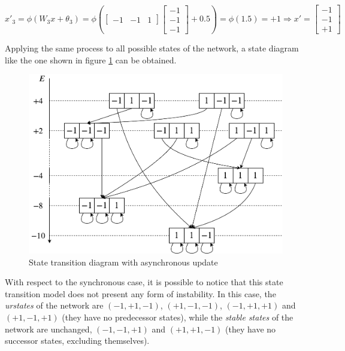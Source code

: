 \documentclass[letterpaper,headings=standardclasses]{scrartcl}
\begin{document}
$$ x'_{3} = \phi(W_3 x + \theta_3) = \phi \left( \left[ \begin{matrix} -1 & -1 & 1 \end{matrix} \right] \left[ \begin{matrix} -1 \\ -1 \\ -1 \end{matrix} \right] + 0.5 \right) = \phi \left( 1.5 \right) = +1 \Rightarrow x' = \left[ \begin{matrix} -1 \\ -1 \\ +1 \end{matrix} \right] $$

Applying the same process to all possible states of the network, a state diagram like the one shown in figure \ref{async} can be obtained.

\begin{figure}[h]
    \centering
    \includegraphics[width=0.7\linewidth]{async.pdf}
    \caption{State transition diagram with asynchronous update}
    \label{async}
\end{figure}

With respect to the synchronous case, it is possible to notice that this state transition model does not present any form of instability. In this case, the \emph{urstates} of the network are $(-1, +1, -1)$, $(+1, -1, -1)$, $(-1, +1, +1)$ and $(+1, -1, +1)$ (they have no predecessor states), while the \emph{stable states} of the network are unchanged, $(-1, -1, +1)$ and $(+1, +1, -1)$ (they have no successor states, excluding themselves).
\end{document}
